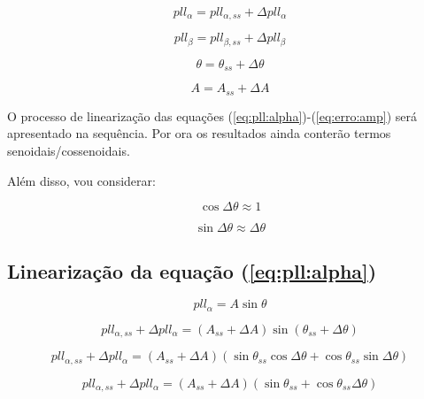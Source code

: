 \documentclass[12pt,a4paper]{report}
\begin{document}
\begin{equation}
pll_\alpha =
pll_{\alpha,ss} + 
\Delta pll_\alpha
\end{equation} 

\begin{equation}
pll_\beta =
pll_{\beta,ss} + 
\Delta pll_\beta
\end{equation} 


\begin{equation}
\theta =
\theta_{ss} + \Delta \theta
\end{equation}

\begin{equation}
A = A_{ss} + \Delta A
\end{equation}


O processo de linearização das equações (\ref{eq:pll:alpha})-(\ref{eq:erro:amp}) será apresentado na sequência. Por ora os resultados ainda conterão termos senoidais/cossenoidais. 

Além disso, vou considerar:

\begin{equation}
\cos \Delta \theta \approx 1
\end{equation}

\begin{equation}
\sin \Delta \theta \approx \Delta \theta
\end{equation}

\subsection{Linearização da equação (\ref{eq:pll:alpha})}


\begin{equation}
pll_\alpha = A \sin \theta
\end{equation}



\begin{equation}
pll_{\alpha,ss} + \Delta pll_{\alpha} = 
\left(
A_{ss} + \Delta A
\right) 
\sin ( \theta_{ss} +  \Delta \theta )
\end{equation}


\begin{equation}
pll_{\alpha,ss} + \Delta pll_{\alpha} = 
\left(
A_{ss} + \Delta A
\right) 
\left(
\sin \theta_{ss} \cos \Delta \theta +
\cos \theta_{ss} \sin \Delta \theta
\right)
\end{equation}


\begin{equation}
pll_{\alpha,ss} + \Delta pll_{\alpha} = 
\left(
A_{ss} + \Delta A
\right) 
\left(
\sin \theta_{ss}  +
\cos \theta_{ss} \Delta \theta
\right)
\end{equation}
\end{document}
